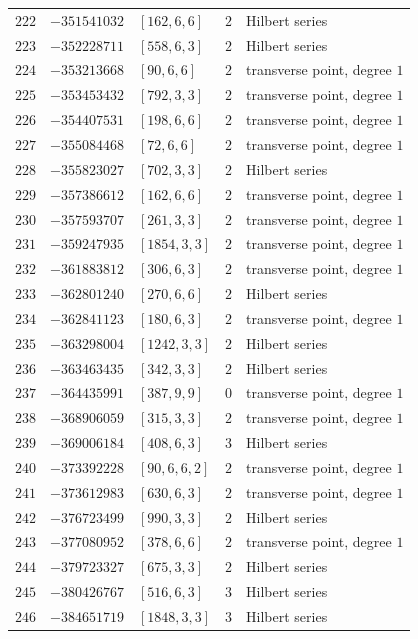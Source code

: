 \documentclass[11pt]{article}
\begin{document}
\begin{center}
\begin{longtable}{r r l c l}
$222$ & $-351541032$ & $[162,6,6]$ & $2$ & Hilbert series\\
$223$ & $-352228711$ & $[558,6,3]$ & $2$ & Hilbert series\\
$224$ & $-353213668$ & $[90,6,6]$ & $2$ & transverse point, degree $1$\\
$225$ & $-353453432$ & $[792,3,3]$ & $2$ & transverse point, degree $1$\\
$226$ & $-354407531$ & $[198,6,6]$ & $2$ & transverse point, degree $1$\\
$227$ & $-355084468$ & $[72,6,6]$ & $2$ & transverse point, degree $1$\\
$228$ & $-355823027$ & $[702,3,3]$ & $2$ & Hilbert series\\
$229$ & $-357386612$ & $[162,6,6]$ & $2$ & transverse point, degree $1$\\
$230$ & $-357593707$ & $[261,3,3]$ & $2$ & transverse point, degree $1$\\
$231$ & $-359247935$ & $[1854,3,3]$ & $2$ & transverse point, degree $1$\\
$232$ & $-361883812$ & $[306,6,3]$ & $2$ & transverse point, degree $1$\\
$233$ & $-362801240$ & $[270,6,6]$ & $2$ & Hilbert series\\
$234$ & $-362841123$ & $[180,6,3]$ & $2$ & transverse point, degree $1$\\
$235$ & $-363298004$ & $[1242,3,3]$ & $2$ & Hilbert series\\
$236$ & $-363463435$ & $[342,3,3]$ & $2$ & Hilbert series\\
$237$ & $-364435991$ & $[387,9,9]$ & $0$ & transverse point, degree $1$\\
$238$ & $-368906059$ & $[315,3,3]$ & $2$ & transverse point, degree $1$\\
$239$ & $-369006184$ & $[408,6,3]$ & $3$ & Hilbert series\\
$240$ & $-373392228$ & $[90,6,6,2]$ & $2$ & transverse point, degree $1$\\
$241$ & $-373612983$ & $[630,6,3]$ & $2$ & transverse point, degree $1$\\
$242$ & $-376723499$ & $[990,3,3]$ & $2$ & Hilbert series\\
$243$ & $-377080952$ & $[378,6,6]$ & $2$ & transverse point, degree $1$\\
$244$ & $-379723327$ & $[675,3,3]$ & $2$ & Hilbert series\\
$245$ & $-380426767$ & $[516,6,3]$ & $3$ & Hilbert series\\
$246$ & $-384651719$ & $[1848,3,3]$ & $3$ & Hilbert series\\

\end{longtable}
\end{center}
\end{document}
